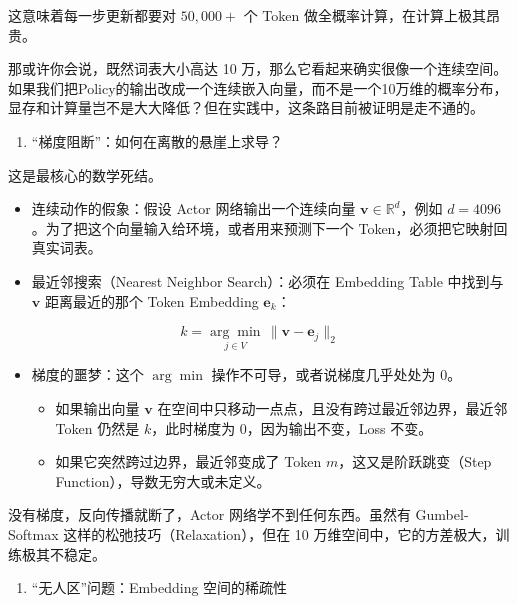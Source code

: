 这意味着每一步更新都要对 \(50,000+\) 个 Token 做全概率计算，在计算上极其昂贵。

那或许你会说，既然词表大小高达 10 万，那么它看起来确实很像一个连续空间。如果我们把Policy的输出改成一个连续嵌入向量，而不是一个10万维的概率分布，显存和计算量岂不是大大降低？但在实践中，这条路目前被证明是走不通的。

\begin{enumerate}
\def\labelenumi{\arabic{enumi}.}
\tightlist
\item
  ``梯度阻断''：如何在离散的悬崖上求导？
\end{enumerate}

这是最核心的数学死结。

\begin{itemize}
\tightlist
\item
  连续动作的假象：假设 Actor 网络输出一个连续向量 \(\mathbf{v}\in\mathbb{R}^d\)，例如 \(d=4096\)。为了把这个向量输入给环境，或者用来预测下一个 Token，必须把它映射回真实词表。
\item
  最近邻搜索（Nearest Neighbor Search）：必须在 Embedding Table 中找到与 \(\mathbf{v}\) 距离最近的那个 Token Embedding \(\mathbf{e}_k\)：
\end{itemize}

\[
k
=
\underset{j\in V}{\arg\min}\,
\lVert \mathbf{v}-\mathbf{e}_j\rVert_2
\]

\begin{itemize}
\tightlist
\item
  梯度的噩梦：这个 \(\arg\min\) 操作不可导，或者说梯度几乎处处为 0。

  \begin{itemize}
  \tightlist
  \item
    如果输出向量 \(\mathbf{v}\) 在空间中只移动一点点，且没有跨过最近邻边界，最近邻 Token 仍然是 \(k\)，此时梯度为 0，因为输出不变，Loss 不变。
  \item
    如果它突然跨过边界，最近邻变成了 Token \(m\)，这又是阶跃跳变（Step Function），导数无穷大或未定义。
  \end{itemize}
\end{itemize}

没有梯度，反向传播就断了，Actor 网络学不到任何东西。虽然有 Gumbel-Softmax 这样的松弛技巧（Relaxation），但在 10 万维空间中，它的方差极大，训练极其不稳定。

\begin{enumerate}
\def\labelenumi{\arabic{enumi}.}
\setcounter{enumi}{1}
\tightlist
\item
  ``无人区''问题：Embedding 空间的稀疏性
\end{enumerate}

